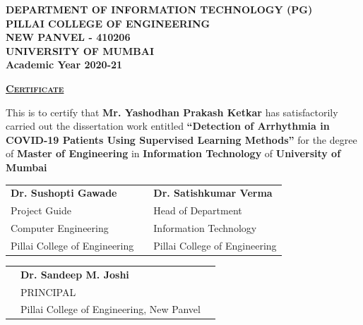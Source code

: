 \thispagestyle{empty}
{\centering\large
    \begin{figure}[h!]
        {\par}
    \end{figure}
    \vspace{0.2cm}

    {\bf
        DEPARTMENT OF INFORMATION TECHNOLOGY (PG)\\
        PILLAI COLLEGE OF ENGINEERING\\
        NEW PANVEL - 410206\\
        UNIVERSITY OF MUMBAI\\
        Academic Year 2020-21\\
    }
}

\begin{spacing}{1.2}
\vspace{0.5cm}
{\centering
    {\LARGE\bf\scshape
        \underline{Certificate}\\
    }
}

\vspace{1cm}
\noindent
This is to certify that \textbf{Mr. Yashodhan Prakash Ketkar} has satisfactorily carried out
the dissertation work entitled \textbf{``Detection of Arrhythmia in COVID-19 Patients Using
Supervised Learning Methods''} for the degree of \textbf{Master of Engineering} in
\textbf{Information Technology} of \textbf{University of Mumbai}

\vspace{2.5cm}
\begin{table}[H]
    \centering
    \begin{tabularx}{\textwidth}{@{}L{13em}C{9em}R{13em}@{}}
        {\large\bf Dr. Sushopti Gawade} &  & {\large\bf Dr. Satishkumar Verma} \\
        Project Guide & & Head of Department\\
        Computer Engineering & & Information Technology \\
        Pillai College of Engineering & & Pillai College of Engineering \\
    \end{tabularx}
\end{table}

\vspace{2.5cm}
\begin{table}[H]
    \centering
    \begin{tabularx}{\textwidth}{@{}L{6em}C{23em}R{6em}@{}}
         & {\large\bf Dr. Sandeep M. Joshi} & \\
         & PRINCIPAL & \\
         & Pillai College of Engineering, New Panvel & \\
    \end{tabularx}
\end{table}
\end{spacing}